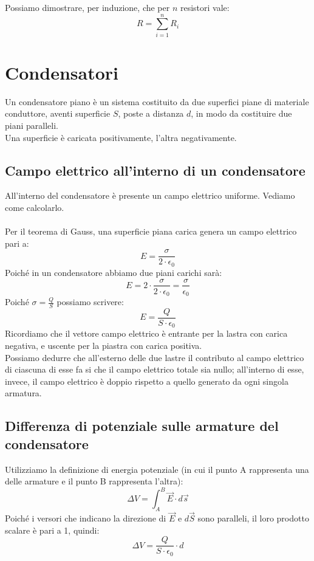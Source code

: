 Possiamo dimostrare, per induzione, che per $n$ resistori vale:
\begin{displaymath}
	R = \sum_{i=1}^n R_i
\end{displaymath}

\section{Condensatori}
Un condensatore piano è un sistema costituito da due superfici piane di materiale conduttore, aventi superficie $S$, poste a distanza $d$, in modo da costituire due piani paralleli.\\
Una superficie è caricata positivamente, l'altra negativamente.

\subsection{Campo elettrico all'interno di un condensatore}
All'interno del condensatore è presente un campo elettrico uniforme. Vediamo come calcolarlo.\\\\
Per il teorema di Gauss, una superficie piana carica genera un campo elettrico pari a:
\begin{displaymath}
	E = \frac{\sigma}{2 \cdot \epsilon_0}
\end{displaymath}
Poiché in un condensatore abbiamo due piani carichi sarà:
\begin{displaymath}
	E = 2 \cdot \frac{\sigma}{2 \cdot \epsilon_0} = \frac{\sigma}{\epsilon_0}
\end{displaymath}
Poiché $\sigma = \frac{Q}{S}$ possiamo scrivere:
\begin{displaymath}
	E = \frac{Q}{S \cdot \epsilon_0}
\end{displaymath}
Ricordiamo che il vettore campo elettrico è entrante per la lastra con carica negativa, e uscente per la piastra con carica positiva.\\
Possiamo dedurre che all’esterno delle due lastre il contributo al campo elettrico di ciascuna di esse fa si che il campo elettrico totale sia nullo; all’interno di esse, invece, il campo elettrico è doppio rispetto a quello generato da ogni singola armatura.

\subsection{Differenza di potenziale sulle armature del condensatore}
Utilizziamo la definizione di energia potenziale (in cui il punto A rappresenta una delle armature e il punto B rappresenta l'altra):
\begin{displaymath}
	\Delta V = \int_A^B \vec{E} \cdot d\vec{s}
\end{displaymath}
Poiché i versori che indicano la direzione di $\vec{E}$ e $d\vec{S}$ sono paralleli, il loro prodotto scalare è pari a 1, quindi:
\begin{displaymath}
	\Delta V = \frac{Q}{S \cdot \epsilon_0} \cdot d
\end{displaymath}

